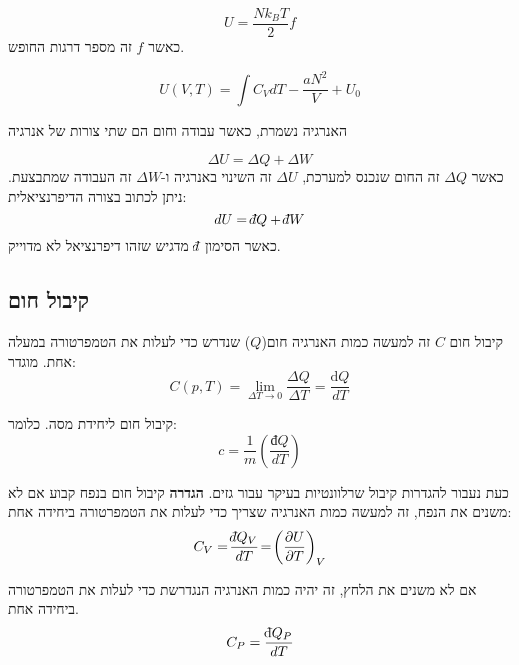 \documentclass{tstextbook}
\begin{document}
\begin{proposition}
$$U={\frac{N k_{B}T}{2}}f$$
כאשר \(f\) זה מספר דרגות החופש.

\end{proposition}
\begin{proposition}
$$U(V,T)=\int C_{V}d T-{\frac{a N^{2}}{V}}+U_{0}$$

\end{proposition}
\begin{theorem}
האנרגיה נשמרת, כאשר עבודה וחום הם שתי צורות של אנרגיה

\end{theorem}
\begin{corollary}
$$\Delta U=\Delta Q+\Delta W$$
כאשר \(\Delta Q\) זה החום שנכנס למערכת, \(\Delta U\) זה השינוי באנרגיה ו-\(\Delta W\) זה העבודה שמתבצעת. ניתן לכתוב בצורה הדיפרנציאלית:
$$dU=\;\bar{}\mkern-7.5mu dQ+\;\bar{}\mkern-7.5mu dW$$
כאשר הסימון \(\;\bar{}\mkern-7.5mu d\) מדגיש שזהו דיפרנציאל לא מדוייק.

\end{corollary}
\subsection{קיבול חום}

\begin{definition}
קיבול חום \(C\) זה למעשה כמות האנרגיה חום(\(Q\)) שנדרש כדי לעלות את הטמפרטורה במעלה אחת. מוגדר:
$$C(p,T)=\operatorname*{lim}_{\Delta T\rightarrow0}\frac{\Delta Q}{\Delta T}=\frac{\mathrm{d}Q}{d T}$$

\end{definition}
\begin{definition}
קיבול חום ליחידת מסה. כלומר:
$$c=\frac{1}{m}\left( \frac{ đ Q}{d T} \right)$$

\end{definition}
כעת נעבור להגדרות קיבול שרלוונטיות בעיקר עבור גזים.
\textbf{הגדרה} קיבול חום בנפח קבוע
אם לא משנים את הנפח, זה למעשה כמות האנרגיה שצריך כדי לעלות את הטמפרטורה ביחידה אחת:
$$C_{V}=\!\frac{\;\bar{}\mkern-7.5mu dQ_{V}}{d T}\!=\!\left(\frac{\partial U}{\partial T}\right)_{V}$$

\begin{definition}
אם לא משנים את הלחץ, זה יהיה כמות האנרגיה הנגדרשת כדי לעלות את הטמפרטורה ביחידה אחת.
$$C_{P}={\frac{\mathrm{\;\bar{}\mkern-7.5mu d}Q_{P}}{d T}}$$

\end{definition}
\end{document}
